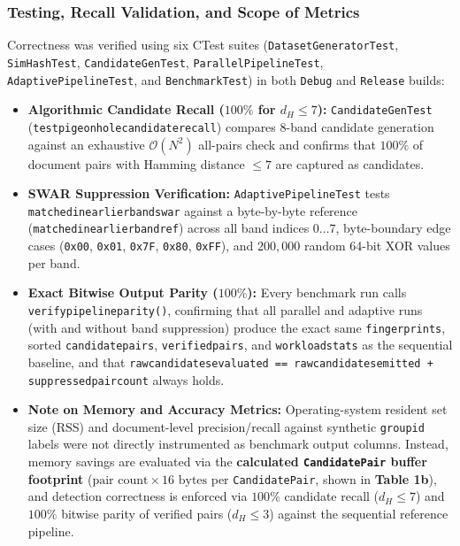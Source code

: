 \documentclass[11pt,a4paper]{article}
\renewcommand{\_}{\textunderscore\allowbreak}
\begin{document}
\subsubsection*{Testing, Recall Validation, and Scope of Metrics}
Correctness was verified using six CTest suites (\texttt{DatasetGeneratorTest}, \texttt{SimHashTest}, \texttt{CandidateGenTest}, \texttt{ParallelPipelineTest}, \texttt{AdaptivePipelineTest}, and \texttt{BenchmarkTest}) in both \texttt{Debug} and \texttt{Release} builds:
\begin{itemize}
    \item \textbf{Algorithmic Candidate Recall ($100\%$ for $d_H \le 7$):} \texttt{CandidateGenTest} (\texttt{test\_pigeonhole\_candidate\_recall}) compares 8-band candidate generation against an exhaustive $\mathcal{O}(N^2)$ all-pairs check and confirms that $100\%$ of document pairs with Hamming distance $\le 7$ are captured as candidates.
    \item \textbf{SWAR Suppression Verification:} \texttt{AdaptivePipelineTest} tests \texttt{matched\_in\_earlier\_band\_swar} against a byte-by-byte reference (\texttt{matched\_in\_earlier\_band\_ref}) across all band indices $0 \dots 7$, byte-boundary edge cases (\texttt{0x00}, \texttt{0x01}, \texttt{0x7F}, \texttt{0x80}, \texttt{0xFF}), and $200,000$ random 64-bit XOR values per band.
    \item \textbf{Exact Bitwise Output Parity ($100\%$):} Every benchmark run calls \texttt{verify\_pipeline\_parity()}, confirming that all parallel and adaptive runs (with and without band suppression) produce the exact same \texttt{fingerprints}, sorted \texttt{candidate\_pairs}, \texttt{verified\_pairs}, and \texttt{workload\_stats} as the sequential baseline, and that \texttt{raw\_candidates\_evaluated == raw\_candidates\_emitted + suppressed\_pair\_count} always holds.
    \item \textbf{Note on Memory and Accuracy Metrics:} Operating-system resident set size (RSS) and document-level precision/recall against synthetic \texttt{group\_id} labels were not directly instrumented as benchmark output columns. Instead, memory savings are evaluated via the \textbf{calculated \texttt{CandidatePair} buffer footprint} ($\text{pair count} \times 16\text{ bytes}$ per \texttt{CandidatePair}, shown in \textbf{Table 1b}), and detection correctness is enforced via $100\%$ candidate recall ($d_H \le 7$) and $100\%$ bitwise parity of verified pairs ($d_H \le 3$) against the sequential reference pipeline.
\end{itemize}
\end{document}
